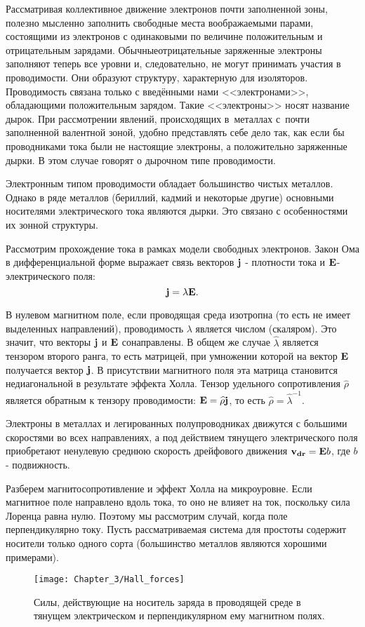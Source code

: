 Рассматривая коллективное движение электронов почти заполненной зоны, полезно мысленно заполнить свободные места
воображаемыми парами, состоящими из электронов с одинаковыми по величине положительным и отрицательным зарядами. Обычныеотрицательные заряженные электроны заполняют теперь все уровни и, следовательно, не могут принимать участия в проводимости. Они образуют структуру, характерную для изоляторов. Проводимость связана только с введёнными нами
<<электронами>>, обладающими положительным зарядом. Такие <<электроны>> носят название \textsf{дырок}. При рассмотрении явлений, происходящих в~металлах с~почти заполненной валентной зоной, удобно представлять себе дело так, как если бы проводниками тока были не настоящие электроны, а положительно заряженные дырки. В этом случае говорят о \textsf{дырочном типе проводимости}.

Электронным типом проводимости обладает большинство чистых металлов. Однако в ряде металлов (бериллий, кадмий и
некоторые другие) основными носителями электрического тока являются дырки. Это связано с особенностями их зонной
структуры.

Рассмотрим прохождение тока в рамках модели свободных электронов.
Закон Ома в дифференциальной форме выражает связь векторов ${\bf j}$ - плотности тока и ${\bf E}$- электрического поля:
\begin{equation}
{\bf j}=\lambda {\bf E}.
\end{equation}

В нулевом магнитном поле, если проводящая среда изотропна (то есть не имеет выделенных направлений), проводимость $\lambda$ является числом (скаляром). Это значит, что векторы ${\bf j}$ и ${\bf E}$ сонаправлены. В общем же случае $\widehat{\lambda}$ является тензором второго ранга, то есть матрицей, при умножении которой на вектор ${\bf E}$ получается вектор ${\bf j}$. В присутствии магнитного поля эта матрица становится недиагональной в результате эффекта Холла. Тензор удельного сопротивления $\widehat{\rho}$ является обратным к тензору проводимости: ${\bf E}=\widehat{\rho} {\bf j}$, то есть $\widehat{\rho}=\widehat{\lambda}^{-1}$.

Электроны в металлах и легированных полупроводниках движутся с большими скоростями во всех направлениях, а под действием тянущего
электрического поля приобретают ненулевую среднюю скорость дрейфового движения ${\bf v_{dr}}= {\bf E}b$, где $b$ - подвижность.

Разберем магнитосопротивление и эффект Холла на микроуровне. Если магнитное поле направлено вдоль тока, то
оно не влияет на ток, поскольку сила Лоренца равна нулю. Поэтому мы рассмотрим случай, когда поле перпендикулярно
току. Пусть рассматриваемая система для простоты содержит носители только одного сорта (большинство металлов
являются хорошими примерами).
\begin{figure}
	\texttt{[image: Chapter\_3/Hall\_forces]}
	\caption{Силы, действующие на носитель заряда в проводящей среде в тянущем электрическом и перпендикулярном ему магнитном полях.}
	\label{fig1}
\end{figure}

